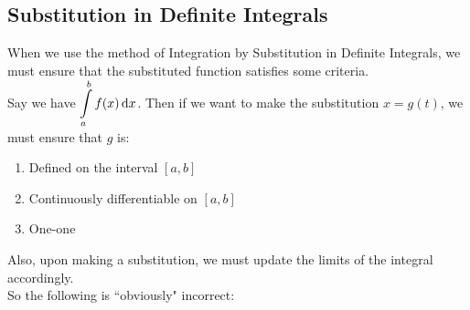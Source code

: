 \documentclass[14]{article}
\theoremstyle{definition}
\theoremstyle{case}
\begin{document}
\subsection{Substitution in Definite Integrals}
When we use the method of Integration by Substitution in Definite Integrals, we must ensure that the substituted function satisfies some criteria.\\
Say we have $\displaystyle \int\limits_a^b f(x) \dif x$. Then if we want to make the substitution $x = g(t)$, we must ensure that $g$ is:
\begin{enumerate}
\item Defined on the interval $[a, b]$
\item Continuously differentiable on $[a, b]$
\item One-one
\end{enumerate}
Also, upon making a substitution, we must update the limits of the integral accordingly.\\
So the following is ``obviously" incorrect:\\
\fbox{
\parbox{\dimexpr\linewidth-2\fboxsep-2\fboxrule\relax}{
\textcolor{red}{
\[I = \int\limits_{-1}^{1} x^4 \dif x\]
Let $x^2 = t$\\
Then, $t = 1$ when $x= -1$ and $t = 1$ when $x = 1$\\
So the integral becomes
\[I = \int\limits_1^1t^2 \dif t = 0\]
}
}}
\end{document}
